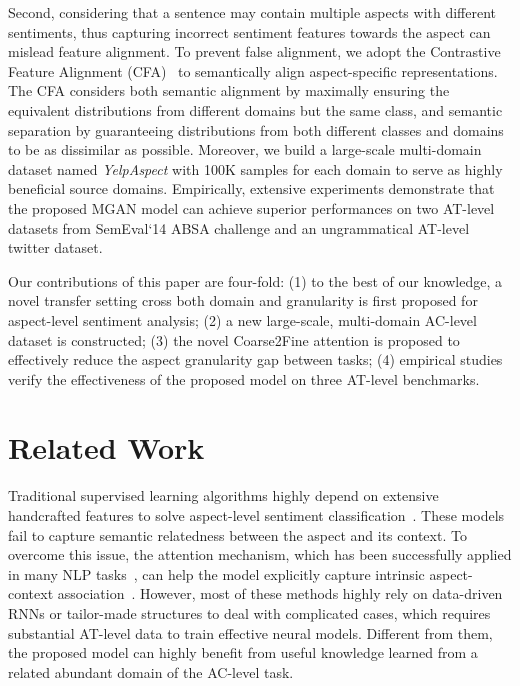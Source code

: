 \documentclass[letterpaper]{article} \usepackage{aaai19}  \usepackage{times}  \usepackage{latexsym}
\begin{document}
Second, considering that a sentence may contain multiple aspects with different sentiments, thus capturing incorrect sentiment features towards the aspect can mislead feature alignment. To prevent false alignment, we adopt the Contrastive Feature Alignment (CFA)~\cite{motiian2017unified} to semantically align aspect-specific representations. The CFA considers both semantic alignment by maximally ensuring the equivalent distributions from different domains but the same class, and semantic separation by guaranteeing distributions from both different classes and domains to be as dissimilar as possible. Moreover, we build a large-scale multi-domain dataset named {\emph{YelpAspect}} with 100K samples for each domain to serve as highly beneficial source domains. Empirically, extensive experiments demonstrate that the proposed MGAN model can achieve superior performances on two AT-level datasets from SemEval`14 ABSA challenge and an ungrammatical AT-level twitter dataset.









Our contributions of this paper are four-fold: (1) to the best of our knowledge, a novel transfer setting cross both domain and granularity is first proposed for aspect-level sentiment analysis; (2) a new large-scale, multi-domain AC-level dataset is constructed; (3) the novel Coarse2Fine attention is proposed to effectively reduce the aspect granularity gap between tasks; (4) empirical studies verify the effectiveness of the proposed model on three AT-level benchmarks.

\vspace{-1mm}
\section{Related Work}
Traditional supervised learning algorithms highly depend on extensive handcrafted features to solve aspect-level sentiment classification~\cite{jiang2011target,kiritchenko2014nrc}. These models fail to capture semantic relatedness between the aspect and its context. To overcome this issue, the attention mechanism, which has been successfully applied in many NLP tasks~\cite{bahdanau2014neural,sukhbaatar2015end,yang2016hierarchical,shen2017disan}, can help the model explicitly capture intrinsic aspect-context association~\cite{tang2015effective,tang2016aspect,wang2016attention,ma2017interactive,chen2017recurrent,ma2018targeted,li2018transformation}. However, most of these methods highly rely on data-driven RNNs or tailor-made structures to deal with complicated cases, which requires substantial AT-level data to train effective neural models. Different from them, the proposed model can highly benefit from useful knowledge learned from a related abundant domain of the AC-level task. 
\end{document}
